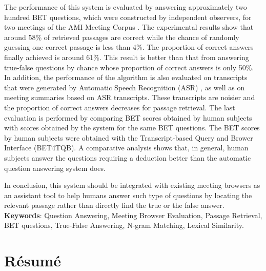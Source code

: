 The performance of this system is evaluated by answering approximately two hundred BET questions, which were constructed by independent observers, for two meetings of the AMI Meeting Corpus \cite{AMI_corpus}. The experimental results show that around 58\% of retrieved passages are correct while the chance of randomly guessing one correct passage is less than 4\%. The proportion of correct answers finally achieved is around 61\%. This result is better than that from answering true-false questions by chance whose proportion of correct answers is only 50\%. In addition, the performance of the algorithm is also evaluated on transcripts that were generated by Automatic Speech Recognition (ASR) , as well as on meeting summaries based on ASR transcripts. These transcripts are noisier and the proportion of correct answers decreases for passage retrieval. The last evaluation is performed by comparing BET scores obtained by human subjects with scores obtained by the system for the same BET questions. The BET scores by human subjects were obtained with the Transcript-based Query and Brower Interface (BET4TQB)\cite{popescubelis2007otm}. A comparative analysis shows that, in general, human subjects answer the questions requiring a deduction better than the automatic question answering system does. 

In conclusion, this system should be integrated with existing meeting browsers as an assistant tool to help humans answer such type of questions by locating the relevant passage rather than directly find the true or the false answer. \\

\textbf{Keywords}: Question Answering, Meeting Browser Evaluation, Passage Retrieval, BET questions, True-False Answering, N-gram Matching, Lexical Similarity.
\small


\pagebreak

\section*{R\'esum\'e}

